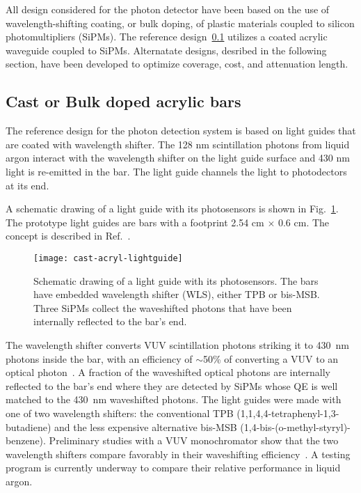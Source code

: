 All design considered for the photon detector have been based on the
use of wavelength-shifting coating, or bulk doping, of plastic
materials coupled to silicon photomultipliers (SiPMs). The reference
design~\ref{sec_bars} utilizes a coated acrylic waveguide coupled to
SiPMs. Alternatate designs, desribed in the following section, have
been developed to optimize coverage, cost, and attenuation length. 


\subsection{Cast or Bulk doped acrylic bars}
\label{sec_bars}

The reference design for the photon detection system is based on light
guides that are coated with wavelength shifter. The 128 nm
scintillation photons from liquid argon interact with the wavelength
shifter on the light guide surface and 430 nm light is re-emitted in
the bar.  The light guide channels the light to photodectors at its
end.

A schematic drawing of a light guide with its photosensors is shown in
Fig.~\ref{fig:WaveguideSketch}. The prototype light guides are bars
with a footprint 2.54 cm $\times$ 0.6 cm.  The concept is described in
Ref.~\cite{bib:MITbars}.
\begin{figure}[ht]
  \begin{center}
    \texttt{[image: cast-acryl-lightguide]}
    \caption{Schematic drawing of a light guide with its
      photosensors. The bars have embedded wavelength shifter (WLS),
      either TPB or bis-MSB. Three SiPMs collect the waveshifted
      photons that have been internally reflected to the bar's end.}
    \label{fig:WaveguideSketch}
  \end{center}
\end{figure}
The wavelength shifter converts VUV scintillation photons striking it
to 430~nm photons inside the bar, with an efficiency of $\sim$50\% of
converting a VUV to an optical photon~\cite{bib:gehman}.  A fraction
of the waveshifted optical photons are internally reflected to the
bar's end where they are detected by SiPMs whose QE is well matched to
the 430~nm waveshifted photons. The light guides were made with one of
two wavelength shifters: the conventional TPB
(1,1,4,4-tetraphenyl-1,3-butadiene) and the less expensive alternative
bis-MSB (1,4-bis-(o-methyl-styryl)-benzene). Preliminary studies with
a VUV monochromator show that the two wavelength shifters compare
favorably in their waveshifting efficiency~\cite{bib:baptistaJINST}. A
testing program is currently underway to compare their relative
performance in liquid argon.

